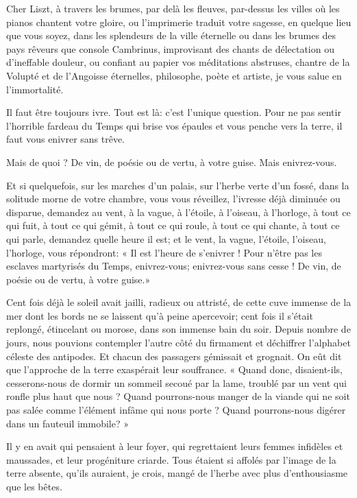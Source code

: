 Cher Liszt, à travers les brumes, par delà les fleuves, par{}-dessus les
villes où les pianos chantent votre gloire, ou
l’imprimerie traduit votre sagesse, en quelque lieu
que vous soyez, dans les splendeurs de la ville éternelle ou dans les
brumes des pays rêveurs que console Cambrinus, improvisant des chants
de délectation ou d’ineffable douleur, ou confiant au
papier vos méditations abstruses, chantre de la Volupté et de
l’Angoisse éternelles, philosophe, poète et artiste,
je vous salue en l’immortalité.


Il faut être toujours ivre. Tout est là: c’est
l’unique question. Pour ne pas sentir
l’horrible fardeau du Temps qui brise vos épaules et
vous penche vers la terre, il faut vous enivrer sans trêve.

Mais de quoi ? De vin, de poésie ou de vertu, à votre guise. Mais
enivrez{}-vous.

Et si quelquefois, sur les marches d’un palais, sur
l’herbe verte d’un fossé, dans la
solitude morne de votre chambre, vous vous réveillez,
l’ivresse déjà diminuée ou disparue, demandez au vent,
à la vague, à l’étoile, à l’oiseau, à
l’horloge, à tout ce qui fuit, à tout ce qui gémit, à
tout ce qui roule, à tout ce qui chante, à tout ce qui parle, demandez
quelle heure il est; et le vent, la vague, l’étoile,
l’oiseau, l’horloge, vous répondront:
« Il est l’heure de s’enivrer ! Pour
n’être pas les esclaves martyrisés du Temps,
enivrez{}-vous; enivrez{}-vous sans cesse ! De vin, de poésie ou de
vertu, à votre guise.»


Cent fois déjà le soleil avait jailli, radieux ou attristé, de cette
cuve immense de la mer dont les bords ne se laissent
qu’à peine apercevoir; cent fois il
s’était replongé, étincelant ou morose, dans son
immense bain du soir. Depuis nombre de jours, nous pouvions contempler
l’autre côté du firmament et déchiffrer
l’alphabet céleste des antipodes. Et chacun des
passagers gémissait et grognait. On eût dit que
l’approche de la terre exaspérait leur souffrance. «
Quand donc, disaient{}-ils, cesserons{}-nous de dormir un sommeil
secoué par la lame, troublé par un vent qui ronfle plus haut que nous ?
Quand pourrons{}-nous manger de la viande qui ne soit pas salée comme
l’élément infâme qui nous porte ? Quand
pourrons{}-nous digérer dans un fauteuil immobile? »

Il y en avait qui pensaient à leur foyer, qui regrettaient leurs femmes
infidèles et maussades, et leur progéniture criarde. Tous étaient si
affolés par l’image de la terre absente,
qu’ils auraient, je crois, mangé de
l’herbe avec plus d’enthousiasme que
les bêtes.

